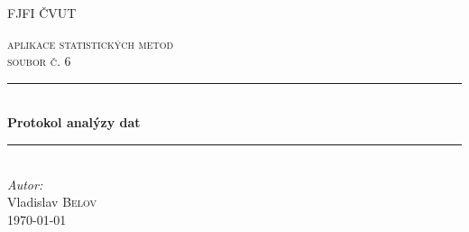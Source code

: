 \documentclass[11pt,american,czech]{article}
\begin{document}
\def\documentdate{...}


\begin{titlepage} %
	\newcommand{\HRule}{\rule{\linewidth}{0.5mm}} %
	\center %
	
	\textsc{\LARGE FJFI ČVUT}\\[1.5cm] %
	\vfill
	
	
	\textsc{\Large aplikace statistických metod}\\[0.5cm] %
	\textsc{\large soubor č. 6}\\[0.5cm] %
	\HRule\\[0.4cm]
	{\huge\bfseries Protokol analýzy dat}\\[0.4cm] %
	\HRule\\[1.5cm]
	{\large\textit{Autor:}}\\
	Vladislav \textsc{Belov}\\
	\vfill\vfill\vfill\vfill\vfill\vfill\vfill %
	{\large\today} %
	

\end{titlepage}
\end{document}
